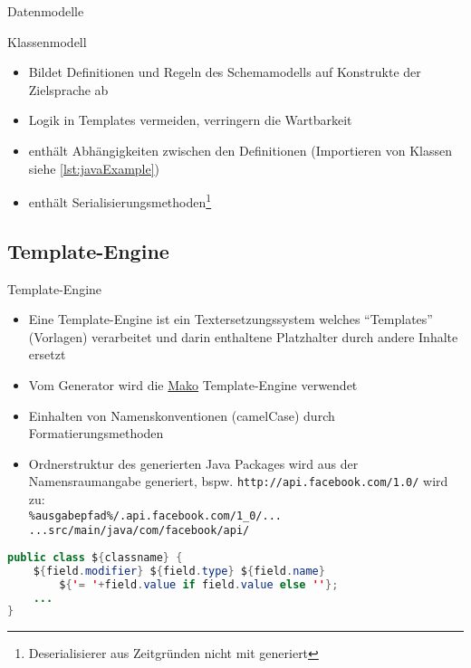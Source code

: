 \begin{frame}{Datenmodelle}
    \begin{block}{Klassenmodell}
        \begin{itemize}
            \item Bildet Definitionen und Regeln des Schemamodells auf Konstrukte der Zielsprache ab
            \item Logik in Templates vermeiden, verringern die Wartbarkeit
            \item enthält Abhängigkeiten zwischen den Definitionen (Importieren von Klassen siehe \cref{lst:javaExample})
            \item enthält Serialisierungsmethoden\footnote{Deserialisierer aus Zeitgründen nicht mit generiert}
        \end{itemize}
    \end{block}
\end{frame}

\subsection{Template-Engine}
\begin{frame}[fragile]{Template-Engine}
    \begin{itemize}
        \item Eine Template-Engine ist ein Textersetzungssystem welches \enquote{Templates} (Vorlagen) verarbeitet und darin enthaltene Platzhalter durch andere Inhalte ersetzt
        \item Vom Generator wird die \href{http://www.makotemplates.org/}{Mako} Template-Engine verwendet
        \item Einhalten von Namenskonventionen (camelCase) durch Formatierungsmethoden
        \item Ordnerstruktur des generierten Java Packages wird aus der Namensraumangabe generiert, bspw. \texttt{http://api.facebook.com/1.0/} wird zu:\\
\small\texttt{\%ausgabepfad\%/.api.facebook.com/1\_0/...\\...src/main/java/com/facebook/api/}
    \end{itemize}
    \begin{lstlisting}[language=Java, caption=Beispieltemplate]
public class ${classname} {
    ${field.modifier} ${field.type} ${field.name}
        ${'= '+field.value if field.value else ''};
    ...
}
    \end{lstlisting}
\end{frame}


